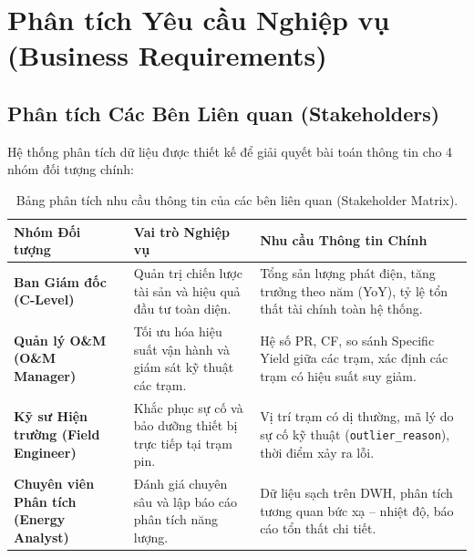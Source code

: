 \documentclass[12pt, a4paper]{report}
\begin{document}
\section{Phân tích Yêu cầu Nghiệp vụ (Business Requirements)}
\label{sec:yeucau_nghiepvu}

\subsection{Phân tích Các Bên Liên quan (Stakeholders)}
Hệ thống phân tích dữ liệu được thiết kế để giải quyết bài toán thông tin cho 4 nhóm đối tượng chính:

\begin{table}[H]
\centering
\small
\renewcommand{\arraystretch}{1.25}
\begin{tabularx}{\textwidth}{@{} l p{4.5cm} X @{}}
\toprule
\textbf{Nhóm Đối tượng} & \textbf{Vai trò Nghiệp vụ} & \textbf{Nhu cầu Thông tin Chính} \\
\midrule
\textbf{Ban Giám đốc (C-Level)} & 
Quản trị chiến lược tài sản và hiệu quả đầu tư toàn diện. & 
Tổng sản lượng phát điện, tăng trưởng theo năm (YoY), tỷ lệ tổn thất tài chính toàn hệ thống. \\
\midrule
\textbf{Quản lý O\&M (O\&M Manager)} & 
Tối ưu hóa hiệu suất vận hành và giám sát kỹ thuật các trạm. & 
Hệ số PR, CF, so sánh Specific Yield giữa các trạm, xác định các trạm có hiệu suất suy giảm. \\
\midrule
\textbf{Kỹ sư Hiện trường (Field Engineer)} & 
Khắc phục sự cố và bảo dưỡng thiết bị trực tiếp tại trạm pin. & 
Vị trí trạm có dị thường, mã lý do sự cố kỹ thuật (\texttt{outlier\_reason}), thời điểm xảy ra lỗi. \\
\midrule
\textbf{Chuyên viên Phân tích (Energy Analyst)} & 
Đánh giá chuyên sâu và lập báo cáo phân tích năng lượng. & 
Dữ liệu sạch trên DWH, phân tích tương quan bức xạ -- nhiệt độ, báo cáo tổn thất chi tiết. \\
\bottomrule
\end{tabularx}
\caption{Bảng phân tích nhu cầu thông tin của các bên liên quan (Stakeholder Matrix).}
\label{tab:stakeholder_matrix}
\end{table}
\end{document}
